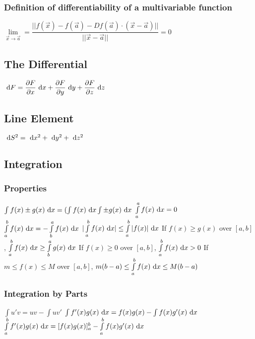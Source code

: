 \subsubsection{Definition of differentiability of a multivariable function}
\begin{itemize}
\itemt \( \lim\limits_{\vec{x}\to\vec{a}} = \dfrac{||f(\vec{x})-f(\vec{a}) - Df(\vec{a})\cdot(\vec{x}-\vec{a})||}{||\vec{x}-\vec{a}||} = 0\)
\end{itemize}


		\subsection{The Differential}
\begin{itemize}
\itemt \( \ \mathrm{d}F = \dfrac{\partial F}{\partial x}\ \mathrm{d}x + \dfrac{\partial F}{\partial y}\ \mathrm{d}y + \dfrac{\partial F}{\partial z}\ \mathrm{d}z \)
\end{itemize}


		\subsection{Line Element}
\begin{itemize}
\itemt \( \ \mathrm{d}S^2 = \ \mathrm{d}x^2 + \ \mathrm{d}y^2 + \ \mathrm{d}z^2 \)
\end{itemize}	


		\subsection{Integration}

\subsubsection{Properties}
\begin{itemize}
\itemt \( \int f(x) \pm g(x) \ \mathrm{d}x = ( \int f(x)\ \mathrm{d}x \int \pm g(x) \ \mathrm{d}x \)
\itemt \( \int\limits_a^a f(x) \ \mathrm{d}x = 0 \)
\itemt \( \int\limits_a^b f(x) \ \mathrm{d}x = -\int\limits_b^a f(x) \ \mathrm{d}x \)
\itemt \( |\int\limits_a^b f(x) \ \mathrm{d}x| \leq \int\limits_a^b |f(x)| \ \mathrm{d}x \)
\itemt If \( f(x) \geq g(x) \) over $[a,b]$, \( \int\limits_a^b f(x) \ \mathrm{d}x \geq \int\limits_b^a g(x) \ \mathrm{d}x \)
\itemt If \( f(x) \geq 0 \) over $[a,b]$, \( \int\limits_a^b f(x) \ \mathrm{d}x > 0 \)
\itemt If \( m\leq f(x) \leq M \) over $[a,b]$, \( m(b-a) \leq \int\limits_a^b f(x) \ \mathrm{d}x \leq M(b-a) \)
\end{itemize}

\subsubsection{Integration by Parts}			
\begin{itemize}
\itemt \( \int u'v = uv - \int uv' \)
\itemt \( \int f'(x)g(x) \ \mathrm{d}x = f(x)g(x) - \int f(x)g'(x) \ \mathrm{d}x \)				
\itemt \( \int\limits_a^b f'(x)g(x) \ \mathrm{d}x = [f(x)g(x)]^b_a - \int\limits_a^b f(x)g'(x) \ \mathrm{d}x \)
\end{itemize}	

